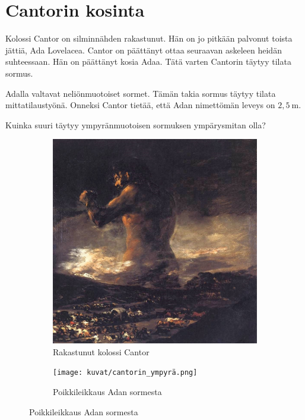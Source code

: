 \clearpage

\section{Cantorin kosinta}

Kolossi Cantor on silminnähden rakastunut. Hän on jo pitkään palvonut toista jättiä, Ada Lovelacea. Cantor on päättänyt ottaa seuraavan askeleen heidän suhteessaan. Hän on päättänyt kosia Adaa. Tätä varten Cantorin täytyy tilata sormus. 


Adalla valtavat neliönmuotoiset sormet. Tämän takia sormus täytyy tilata mittatilaustyönä. Onneksi Cantor tietää, että Adan nimettömän leveys on $2,5 \ \text{m}$.


Kuinka suuri täytyy ympyränmuotoisen sormuksen ympärysmitan olla?


\begin{figure}[h]
    \begin{subfigure}{.5\textwidth}
        \centering
        \includegraphics[width=.9\linewidth]{kuvat/cantor_jättiläinen.jpg}
        \caption*{Rakastunut kolossi Cantor}
  \end{subfigure}%
  \begin{subfigure}{.5\textwidth}
  \centering
    \texttt{[image: kuvat/cantorin\_ympyrä.png]}
    \caption*{Poikkileikkaus Adan sormesta}
  \end{subfigure}
\end{figure}
